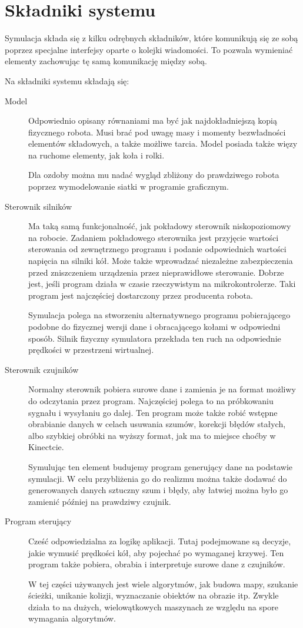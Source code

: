 \section{Składniki systemu}
Symulacja składa się z kilku odrębnych składników, które komunikują się ze sobą poprzez specjalne interfejsy oparte o kolejki wiadomości.
To pozwala wymieniać elementy zachowując tę samą komunikację między sobą.

Na składniki systemu składają się:
\begin{description}
 \item[Model] Odpowiednio opisany równaniami ma być jak najdokładniejszą kopią fizycznego robota.
 Musi brać pod uwagę masy i momenty bezwładności elementów składowych, a także możliwe tarcia.
 Model posiada także więzy na ruchome elementy, jak koła i rolki.
 
 Dla ozdoby można mu nadać wygląd zbliżony do prawdziwego robota poprzez wymodelowanie siatki w programie graficznym.
 
 \item[Sterownik silników] Ma taką samą funkcjonalność, jak pokładowy sterownik niskopoziomowy na robocie.
 Zadaniem pokładowego sterownika jest przyjęcie wartości sterowania od zewnętrznego programu i podanie odpowiednich wartości napięcia na silniki kół.
 Może także wprowadzać niezależne zabezpieczenia przed zniszczeniem urządzenia przez nieprawidłowe sterowanie.
 Dobrze jest, jeśli program działa w czasie rzeczywistym na mikrokontrolerze.
 Taki program jest najczęściej dostarczony przez producenta robota.
 
 Symulacja polega na stworzeniu alternatywnego programu pobierającego podobne do fizycznej wersji dane i obracającego kołami w odpowiedni sposób.
 Silnik fizyczny symulatora przekłada ten ruch na odpowiednie prędkości w przestrzeni wirtualnej.
 
 \item[Sterownik czujników] Normalny sterownik pobiera surowe dane i zamienia je na format możliwy do odczytania przez program.
 Najczęściej polega to na próbkowaniu sygnału i wysyłaniu go dalej.
 Ten program może także robić wstępne obrabianie danych w celach usuwania szumów, korekcji błędów stałych, albo szybkiej obróbki na wyższy format, jak ma to miejsce choćby w Kinectcie.
 
 Symulując ten element budujemy program generujący dane na podstawie symulacji. 
 W celu przybliżenia go do realizmu można także dodawać do generowanych danych sztuczny szum i błędy, aby łatwiej można było go zamienić później na prawdziwy czujnik.
 
 \item[Program sterujący] Cześć odpowiedzialna za logikę aplikacji. Tutaj podejmowane są decyzje, jakie wymusić prędkości kół, aby pojechać po wymaganej krzywej.
 Ten program także pobiera, obrabia i interpretuje surowe dane z czujników.
 
 W tej części używanych jest wiele algorytmów, jak budowa mapy, szukanie ścieżki, unikanie kolizji, wyznaczanie obiektów na obrazie itp.
 Zwykle działa to na dużych, wielowątkowych maszynach ze względu na spore wymagania algorytmów.

\end{description}

